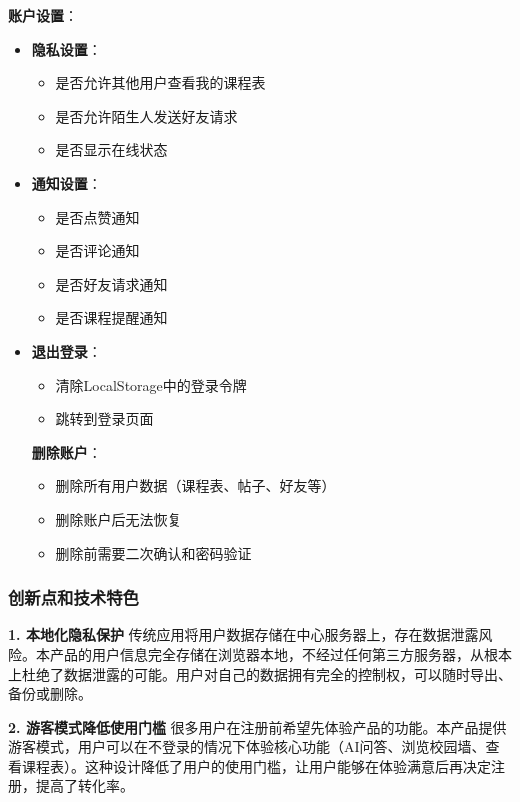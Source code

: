 \documentclass[12pt,a4paper]{article}
\begin{document}
\textbf{账户设置}：
\begin{itemize}
    \item \textbf{隐私设置}：
        \begin{itemize}
            \item 是否允许其他用户查看我的课程表
            \item 是否允许陌生人发送好友请求
            \item 是否显示在线状态
        \end{itemize}
    \item \textbf{通知设置}：
        \begin{itemize}
            \item 是否点赞通知
            \item 是否评论通知
            \item 是否好友请求通知
            \item 是否课程提醒通知
        \end{itemize}
    \item \textbf{退出登录}：
        \begin{itemize}
            \item 清除LocalStorage中的登录令牌
            \item 跳转到登录页面
        \end{itemize}
    \textbf{删除账户}：
        \begin{itemize}
            \item 删除所有用户数据（课程表、帖子、好友等）
            \item 删除账户后无法恢复
            \item 删除前需要二次确认和密码验证
        \end{itemize}
\end{itemize}

\subsubsection{创新点和技术特色}

\textbf{1. 本地化隐私保护}
传统应用将用户数据存储在中心服务器上，存在数据泄露风险。本产品的用户信息完全存储在浏览器本地，不经过任何第三方服务器，从根本上杜绝了数据泄露的可能。用户对自己的数据拥有完全的控制权，可以随时导出、备份或删除。

\textbf{2. 游客模式降低使用门槛}
很多用户在注册前希望先体验产品的功能。本产品提供游客模式，用户可以在不登录的情况下体验核心功能（AI问答、浏览校园墙、查看课程表）。这种设计降低了用户的使用门槛，让用户能够在体验满意后再决定注册，提高了转化率。
\end{document}
